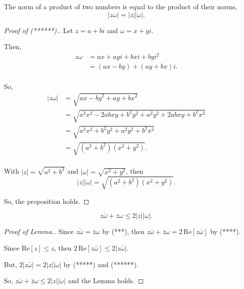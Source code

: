 \documentclass[../hw4]{subfiles}
\begin{document}
\begin{enumerate}[label= (\alph*)]
    \begin{proposition}[******]
        The norm of a product of two numbers is equal to the product of their norms, \[|z\omega|=|z||\omega|.\]
    \end{proposition}

    \begin{proof}[Proof of (******).]
        Let $z=a+bi$ and $\omega=x+yi$.

        Then,
        \begin{align*}
            z\omega&=ax+ayi+bxi+byi^2\\
            &=(ax-by)+(ay+bx)i. \\
        \end{align*}

        So,
        \begin{align*}
            |z\omega|&=\sqrt{{ax-by}^2+{ay+bx}^2} \\
            &= \sqrt{a^2x^2-2abxy+b^2y^2+a^2y^2+2abxy+b^2x^2}\\
            &= \sqrt{a^2x^2+b^2y^2+a^2y^2+b^2x^2} \\
            &= \sqrt{(a^2+b^2)(x^2+y^2)}. \\
        \end{align*}

        With $|z|=\sqrt{a^2+b^2}$ and $|\omega|=\sqrt{x^2+y^2}$, then
        \[|z||\omega|=\sqrt{(a^2+b^2)(x^2+y^2)}.\]
        
        So, the proposition holds.
    \end{proof}

    \begin{lemma}
        \[z\bar{\omega}+\bar{z}\omega\leq 2|z||\omega|.\]
    \end{lemma}

    \begin{proof}[Proof of Lemma.]
        Since $\overline{z\bar{\omega}}=\bar{z}\omega$ by (***), then $z\bar{\omega} + \bar{z}\omega = 2\,\text{Re}[z\bar{\omega}]$ by (****).

        Since $\text{Re}[z]\leq z$, then $2\,\text{Re}[z\bar{\omega}]\leq2|z\bar{\omega}|$.

        But, $2|z\bar{\omega}|=2|z||\omega|$ by (*****) and (******).

        So, $z\bar{\omega}+\bar{z}\omega\leq 2|z||\omega|$ and the Lemma holds.
    \end{proof}


\end{enumerate}
\end{document}
